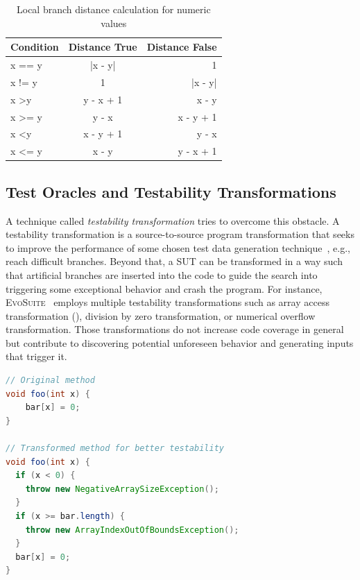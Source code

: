 \documentclass[paper=a4,%
  twoside,%
  BCOR4mm,%
  abstract=true,%
  toc=bibliography,%
  chapterprefix=true,%
  toc=bibliographynumbered,%
  open=right,%
  english,%
  pagesize=pdftex]{scrreprt}
\begin{document}
\begin{table}[]
\centering
\begin{tabular}{lcr}
\hline
\textbf{Condition}  & \textbf{Distance True} & \textbf{Distance False} \\
\hline
x == y              & |x - y|                & 1                       \\
x != y              & 1                      & |x - y|                 \\
x \textgreater y    & y - x + 1              & x - y                   \\
x \textgreater{}= y & y - x                  & x - y + 1               \\
x \textless y       & x - y + 1              & y - x                   \\
x \textless{}= y    & x - y                  & y - x + 1               \\ \hline
\end{tabular}
\caption{Local branch distance calculation for numeric values}
\label{tab:local-branch-distance-formulas}
\end{table}

\subsection{Test Oracles and Testability Transformations}
\label{sec:testability-transformations}


A technique called \textit{testability transformation} tries to overcome this obstacle. A testability transformation is a source-to-source program transformation that seeks to improve the performance of some chosen test data generation technique~\cite{Harman2004}, e.g., reach difficult branches. Beyond that, a \ac{SUT} can be transformed in a way such that artificial branches are inserted into the code to guide the search into triggering some exceptional behavior and crash the program. For instance, \textsc{EvoSuite}~\cite{Fraser2013} employs multiple testability transformations such as array access transformation (), division by zero transformation, or numerical overflow transformation. Those transformations do not increase code coverage in general but contribute to discovering potential unforeseen behavior and generating inputs that trigger it.

\begin{lstlisting}[language=Java, style=boxed, caption={Array access transformation in \textsc{EvoSuite} for Java}, label=lst:evosuite-array-access-transformation]
// Original method
void foo(int x) {
    bar[x] = 0;
}

// Transformed method for better testability
void foo(int x) {
  if (x < 0) {
    throw new NegativeArraySizeException();
  }
  if (x >= bar.length) {
    throw new ArrayIndexOutOfBoundsException();
  }
  bar[x] = 0;
}
\end{lstlisting}
\end{document}
